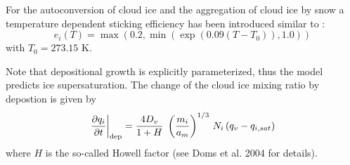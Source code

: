 \begin{itemize}
  For the autoconversion of cloud ice and the aggregation of cloud ice by snow a
  temperature dependent sticking efficiency has been introduced similar to
  \citet{Lin-1983}:
  \begin{equation*}
    e_{i}(T) = \max(0.2,\min(\exp(0.09(T-T_0)),1.0))
  \end{equation*}
  with $T_0=273.15$ K. 

  Note that depositional growth is explicitly
  parameterized, thus the model predicts ice supersaturation. The change of
  the cloud ice mixing ratio by depostion is given by
  \begin{equation}
    \left.\frac{\partial q_i}{\partial t} \right|_{\text{dep}} 
    = \frac{4 D_v}{1 + H} \; \left ( \frac{m_i}{a_m} \right ) ^{1/3} 
    \, N_i \, (q_v - q_{i,sat})
  \end{equation}
  where $H$ is the so-called Howell factor (see Doms et al. 2004 for details).

\end{itemize}

%




%



